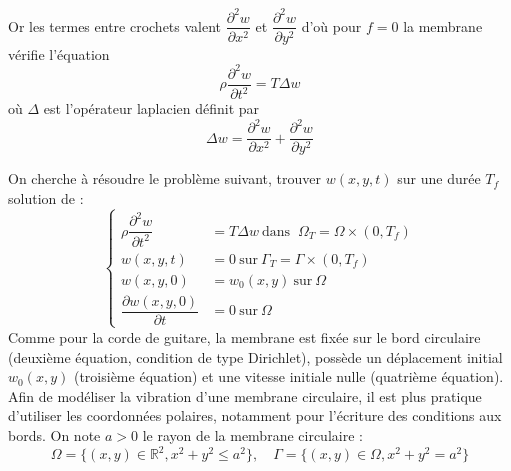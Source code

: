 \documentclass[a4,12pt]{article}
\newcommand{\R}{\mathbb{R}}
\begin{document}
	    Or les termes entre crochets valent $\dfrac{\partial^2 w}{\partial x^2}$ et $\dfrac{\partial^2 w}{\partial y^2}$ d'où pour $f=0$ la membrane vérifie l'équation 
	    \[
	      \rho \dfrac{\partial^2 w}{\partial t^2}=T \Delta w
	    \]
	    où $\Delta$ est l'opérateur laplacien définit par 
	    \[
	      \Delta w=\dfrac{\partial^2 w}{\partial x^2}+\dfrac{\partial^2 w}{\partial y^2}
	    \]

	    On cherche à résoudre le problème suivant, trouver $w(x,y,t)$ sur une durée $T_f$ solution de :
	    \begin{equation}
	      \left\{
		\begin{array}{rl}
		  \rho \dfrac{\partial^2 w}{\partial t^2} & =  T \Delta w ~\textrm{dans } ~ \Omega_T = \Omega \times (0,T_f)\\ 
		  w(x,y,t)& =  0 ~\textrm{sur} ~ \Gamma_T=\Gamma \times (0,T_f)\\
		  w(x,y,0)& = w_0(x,y) ~ \textrm{sur} ~\Omega \\
		  \dfrac{\partial w(x,y,0)}{\partial t} & = 0 ~\textrm{sur} ~\Omega 
		\end{array}
		\right.
		\label{eq:membranemodel}
	      \end{equation}
	      Comme pour la corde de guitare, la membrane est fixée sur le bord circulaire (deuxième équation, condition de type Dirichlet), possède un déplacement initial $w_0(x,y)$ (troisième équation) et une vitesse initiale nulle (quatrième équation). Afin de modéliser la vibration d'une membrane circulaire, il est plus pratique d'utiliser les coordonnées polaires, notamment pour l'écriture des conditions aux bords. On note $a>0$ le rayon de la membrane circulaire : 
	      \[
		\Omega=\{(x,y)\in \R^2, x^2+y^2 \leq a^2\}, \quad \Gamma=\{(x,y)\in \Omega,  x^2+y^2 = a^2\}
	      \]
\end{document}
